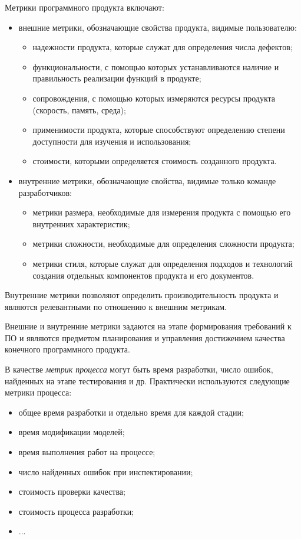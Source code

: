 \documentclass{../../text-style}
\begin{document}
Метрики программного продукта включают:

\begin{itemize}
    \item внешние метрики, обозначающие свойства продукта, видимые пользователю:
    \begin{itemize}
        \item надежности продукта, которые служат для определения числа дефектов;
        \item функциональности, с помощью которых устанавливаются наличие и правильность реализации функций в продукте;
        \item сопровождения, с помощью которых измеряются ресурсы продукта (скорость, память, среда);
        \item применимости продукта, которые способствуют определению степени доступности для изучения и использования;
        \item стоимости, которыми определяется стоимость созданного продукта.
    \end{itemize}
    \item внутренние метрики, обозначающие свойства, видимые только команде разработчиков:
    \begin{itemize}
        \item метрики размера, необходимые для измерения продукта с помощью его внутренних характеристик;
        \item метрики сложности, необходимые для определения сложности продукта;
        \item метрики стиля, которые служат для определения подходов и технологий создания отдельных компонентов продукта и его документов.
    \end{itemize}
\end{itemize}

Внутренние метрики позволяют определить производительность продукта и являются релевантными по отношению к внешним метрикам.

Внешние и внутренние метрики задаются на этапе формирования требований к ПО и являются предметом планирования и управления достижением качества конечного программного продукта.

В качестве \emph{метрик процесса} могут быть время разработки, число ошибок, найденных на этапе тестирования и др. Практически используются следующие метрики процесса:

\begin{itemize}
    \item общее время разработки и отдельно время для каждой стадии;
    \item время модификации моделей;
    \item время выполнения работ на процессе;
    \item число найденных ошибок при инспектировании;
    \item стоимость проверки качества;
    \item стоимость процесса разработки;
    \item ...
\end{itemize}
\end{document}
